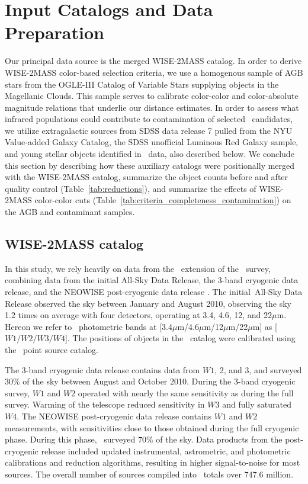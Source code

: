 \section{Input Catalogs and Data Preparation}
\label{sec:data}

Our principal data source is the merged WISE-2MASS catalog. In order to derive
WISE-2MASS color-based selection criteria, we use a homogenous sample of AGB stars from the OGLE-III Catalog of Variable Stars supplying objects in the Magellanic Clouds. This sample serves to calibrate color-color and color-absolute magnitude
relations that underlie our distance estimates. In order to assess what infrared populations
could contribute to contamination of selected \agb\ candidates, we utilize
extragalactic sources from SDSS data release 7 pulled from the NYU Value-added Galaxy Catalog,
the SDSS unofficial Luminous Red Galaxy sample,
and young stellar objects identified in \wise\ data, also described below. 
We conclude this section by describing how these auxiliary catalogs were positionally merged
with the WISE-2MASS catalog, summarize the object counts before and after quality control (Table~\ref{tab:reductions}), and summarize the effects of WISE-2MASS color-color cuts (Table~\ref{tab:criteria_completeness_contamination}) on the AGB and contaminant samples. 

\subsection{WISE-2MASS catalog}
In this study, we rely heavily on data from the \allwise\, extension of the \wise\, survey, combining data from the initial All-Sky Data Release, the 3-band cryogenic data release, and the NEOWISE post-cryogenic data release \citep{2013wise.rept....1C}. The initial \wise\,All-Sky Data Release observed the sky between January and August 2010, observing the sky 1.2 times on average with four detectors, operating at 3.4, 4.6, 12, and 22$\mu$m. Hereon we refer to \allwise\, photometric bands at [3.4$\mu$m/4.6$\mu$m/12$\mu$m/22$\mu$m] as [$W1/W2/W3/W4$]. The positions of objects in the \wise\, catalog were calibrated using the \twomass\, point source catalog. 

The 3-band cryogenic data release contains data from $W1$, 2, and 3, and surveyed $30\%$ of the sky between August and October 2010. During the 3-band cryogenic survey, $W1$ and $W2$ operated with nearly the same sensitivity as during the full survey. Warming of the telescope reduced sensitivity in $W3$ and fully saturated $W4$. The NEOWISE post-cryogenic data release contains $W1$ and $W2$ measurements, with sensitivities close to those obtained during the full cryogenic phase. During this phase, \wise\, surveyed $70\%$ of the sky. Data products from the post-cryogenic release included updated instrumental, astrometric, and photometric calibrations and reduction algorithms, resulting in higher signal-to-noise for most sources. The overall number of sources compiled into \allwise\, totals over 747.6 million.


